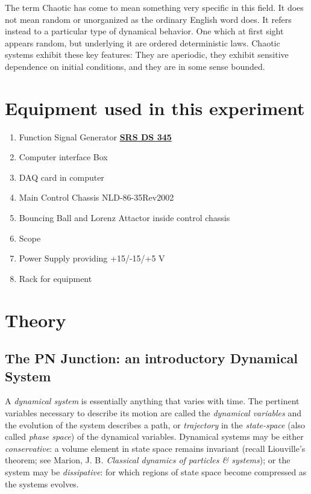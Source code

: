 \documentclass{../lab}
\begin{document}
The term Chaotic has come to mean something very specific in this field. It does not mean random or unorganized as the ordinary English word does. It refers instead to a particular type of dynamical behavior. One which at first sight appears random, but underlying it are ordered deterministic laws. Chaotic systems exhibit these key features: They are aperiodic, they exhibit sensitive dependence on initial conditions, and they are in some sense bounded.

\section{Equipment used in this experiment}

\begin{enumerate}
    \item Function Signal Generator \href{https://youtu.be/PrM8DHFOFS0}{\textbf{SRS DS 345}}

    \item Computer interface Box

    \item DAQ card in computer

    \item Main Control Chassis NLD-86-35Rev2002

    \item Bouncing Ball and Lorenz Attactor inside control chassis

    \item Scope

    \item Power Supply providing +15/-15/+5 V

    \item Rack for equipment

\end{enumerate}

\section{Theory}

\subsection{The PN Junction: an introductory Dynamical System}

A \emph{dynamical system} is essentially anything that varies with time. The pertinent variables necessary to describe its motion are called the \emph{dynamical variables} and the evolution of the system describes a path, or \emph{trajectory} in the \emph{state-space} (also called \emph{phase space}) of the dynamical variables. Dynamical systems may be either \emph{conservative}: a volume element in state space remains invariant (recall Liouville's theorem; see Marion, J. B\emph{. Classical dynamics of particles \& systems}); or the system may be \emph{dissipative}: for which regions of state space become compressed as the systems evolves.
\end{document}
